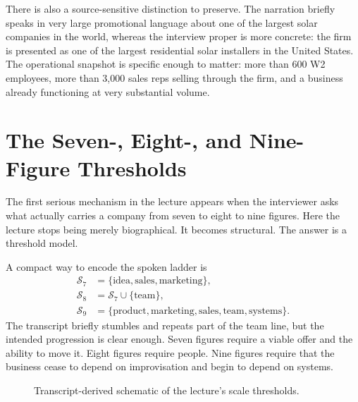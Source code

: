 There is also a source-sensitive distinction to preserve. The narration briefly speaks in very large promotional language about one of the largest solar companies in the world, whereas the interview proper is more concrete: the firm is presented as one of the largest residential solar installers in the United States. The operational snapshot is specific enough to matter: more than 600 W2 employees, more than 3,000 sales reps selling through the firm, and a business already functioning at very substantial volume.

\section{The Seven-, Eight-, and Nine-Figure Thresholds}

The first serious mechanism in the lecture appears when the interviewer asks what actually carries a company from seven to eight to nine figures. Here the lecture stops being merely biographical. It becomes structural. The answer is a threshold model.

A compact way to encode the spoken ladder is
\begin{align}
\mathcal{S}_7 &= \{\text{idea},\text{sales},\text{marketing}\},\\
\mathcal{S}_8 &= \mathcal{S}_7 \cup \{\text{team}\},\\
\mathcal{S}_9 &= \{\text{product},\text{marketing},\text{sales},\text{team},\text{systems}\}.
\end{align}
The transcript briefly stumbles and repeats part of the team line, but the intended progression is clear enough. Seven figures require a viable offer and the ability to move it. Eight figures require people. Nine figures require that the business cease to depend on improvisation and begin to depend on systems.

\begin{figure}[h]
\centering
{}
\caption{Transcript-derived schematic of the lecture's scale thresholds.}
\end{figure}

